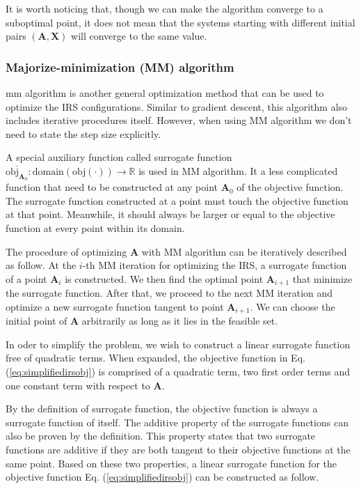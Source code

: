 \documentclass[12pt,draftclsnofoot,onecolumn,journal]{IEEEtran}
\begin{document}
It is worth noticing that, though we can make the algorithm converge to a suboptimal point, it does not mean that the systems starting with different initial pairs $(\mathbf A, \mathbf X)$ will converge to the same value.  





\subsubsection{Majorize-minimization (MM) algorithm}
\ac{mm} algorithm  \cite{sankuru2020designing} is another general optimization method that can be used to optimize the IRS configurations. Similar to gradient descent, this algorithm also includes iterative procedures itself.  However, when using MM algorithm we don't need to state the step size explicitly.

A special auxiliary function called surrogate function $\overline{\mathrm{obj}_{\mathbf A_0}}:\mathrm{domain}(\mathrm{obj}(\cdot))\rightarrow \mathbb R$ is used in MM algorithm. It a less complicated function that need to be constructed at any point $\mathbf A_0$ of the objective function. The surrogate function constructed at a point must touch the objective function at that point. Meanwhile, it should always be larger or equal to the objective function at every point within its domain.

 The procedure of optimizing $\mathbf A$ with MM algorithm can be iteratively described as follow. At the $i$-th MM iteration for optimizing the IRS, a surrogate function of a point $\mathbf A_i$ is constructed. We then find the optimal point $\mathbf A_{i+1}$ that minimize the surrogate function. After that, we proceed to the next MM iteration and optimize a new surrogate function tangent to point $\mathbf A_{i+1}$. We can choose the initial point of $\mathbf A$ arbitrarily as long as it lies in the feasible set.


In oder to simplify the problem, we wish to construct a linear surrogate function free of quadratic terms. When expanded, the objective function in Eq. (\ref{eq:simplifiedirsobj}) is comprised of a quadratic term, two first order terms and one constant term with respect to $\mathbf A$. 

By the definition of surrogate function, the objective function is always a surrogate function of itself. The additive property of the surrogate functions can also be proven by the definition. This property states that two surrogate functions are additive if they are both tangent to their objective functions at the same point. Based on these two properties, a linear surrogate function for the objective function Eq. (\ref{eq:simplifiedirsobj}) can be constructed as follow. 
\end{document}
